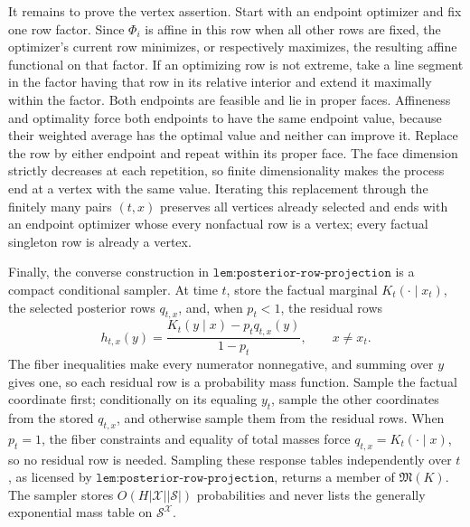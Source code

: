 It remains to prove the vertex assertion.  Start with an endpoint optimizer and fix one row factor.  Since \(\Phi_i\) is affine in this row when all other rows are fixed, the optimizer's current row minimizes, or respectively maximizes, the resulting affine functional on that factor.  If an optimizing row is not extreme, take a line segment in the factor having that row in its relative interior and extend it maximally within the factor.  Both endpoints are feasible and lie in proper faces.  Affineness and optimality force both endpoints to have the same endpoint value, because their weighted average has the optimal value and neither can improve it.  Replace the row by either endpoint and repeat within its proper face.  The face dimension strictly decreases at each repetition, so finite dimensionality makes the process end at a vertex with the same value.  Iterating this replacement through the finitely many pairs \((t,x)\) preserves all vertices already selected and ends with an endpoint optimizer whose every nonfactual row is a vertex; every factual singleton row is already a vertex.

Finally, the converse construction in \(\texttt{lem:posterior-row-projection}\) is a compact conditional sampler.  At time \(t\), store the factual marginal \(K_t(\cdot\mid x_t)\), the selected posterior rows \(q_{t,x}\), and, when \(p_t<1\), the residual rows
\[
 h_{t,x}(y)=\frac{K_t(y\mid x)-p_tq_{t,x}(y)}{1-p_t},
 \qquad x\ne x_t.
\]
The fiber inequalities make every numerator nonnegative, and summing over \(y\) gives one, so each residual row is a probability mass function.  Sample the factual coordinate first; conditionally on its equaling \(y_t\), sample the other coordinates from the stored \(q_{t,x}\), and otherwise sample them from the residual rows.  When \(p_t=1\), the fiber constraints and equality of total masses force \(q_{t,x}=K_t(\cdot\mid x)\), so no residual row is needed.  Sampling these response tables independently over \(t\), as licensed by \(\texttt{lem:posterior-row-projection}\), returns a member of \(\mathfrak M(K)\).  The sampler stores \(O(H|\mathcal X||\mathcal S|)\) probabilities and never lists the generally exponential mass table on \(\mathcal S^{\mathcal X}\).